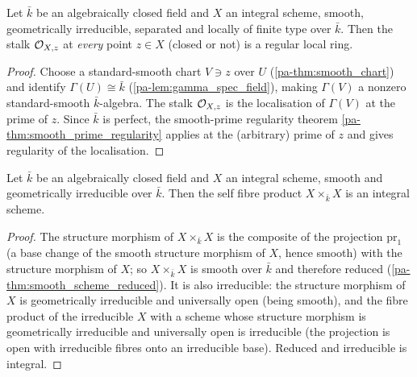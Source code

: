 \begin{theorem}
  \label{pa-thm:smooth_stalk_regular}
  \leanok

  Let \(\bar k\) be an algebraically closed field and \(X\) an integral scheme,
  smooth, geometrically irreducible, separated and locally of finite type over
  \(\bar k\). Then the stalk \(\mathcal{O}_{X,z}\) at \emph{every} point \(z \in X\)
  (closed or not) is a regular local ring.
\end{theorem}
\begin{proof}
  \leanok
  Choose a standard-smooth chart \(V \ni z\) over \(U\)
  (\ref{pa-thm:smooth_chart}) and identify \(\Gamma(U) \cong \bar k\)
  (\ref{pa-lem:gamma_spec_field}), making \(\Gamma(V)\) a nonzero standard-smooth
  \(\bar k\)-algebra. The stalk \(\mathcal{O}_{X,z}\) is the localisation of
  \(\Gamma(V)\) at the prime of \(z\). Since \(\bar k\) is perfect, the
  smooth-prime regularity theorem \ref{pa-thm:smooth_prime_regularity} applies at
  the (arbitrary) prime of \(z\) and gives regularity of the localisation.
\end{proof}

\begin{theorem}
  \label{pa-thm:self_product_integral}
  \leanok

  Let \(\bar k\) be an algebraically closed field and \(X\) an integral scheme,
  smooth and geometrically irreducible over \(\bar k\). Then the self fibre
  product \(X \times_{\bar k} X\) is an integral scheme.
\end{theorem}
\begin{proof}
  \leanok
  The structure morphism of \(X \times_{\bar k} X\) is the composite of the
  projection \(\mathrm{pr}_1\) (a base change of the smooth structure morphism
  of \(X\), hence smooth) with the structure morphism of \(X\); so
  \(X \times_{\bar k} X\) is smooth over \(\bar k\) and therefore reduced
  (\ref{pa-thm:smooth_scheme_reduced}). It is also irreducible: the structure
  morphism of \(X\) is geometrically irreducible and universally open (being
  smooth), and the fibre product of the irreducible \(X\) with a scheme whose
  structure morphism is geometrically irreducible and universally open is
  irreducible (the projection is open with irreducible fibres onto an
  irreducible base). Reduced and irreducible is integral.
\end{proof}

